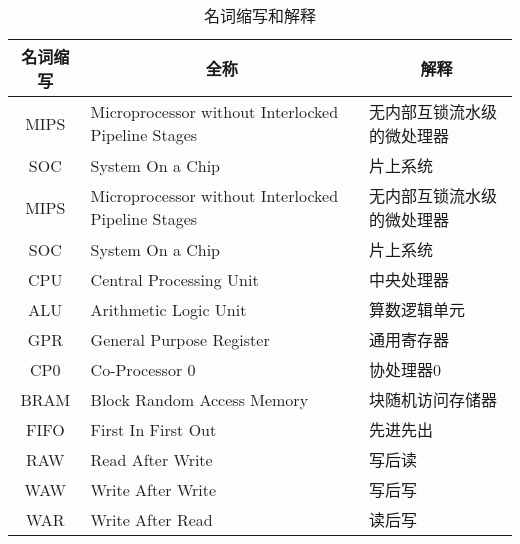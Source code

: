 \begin{table}[!htbp]
    \centering
    \caption{名词缩写和解释}
    \label{table:abbreviation_definition}
    
    \begin{tabular}{cll}
    \toprule
    \multicolumn{1}{c}{\textbf{名词缩写}} & \multicolumn{1}{c}{\textbf{全称}}                   & \multicolumn{1}{c}{\textbf{解释}} \\ 
    \midrule
    MIPS                               & Microprocessor without Interlocked Pipeline Stages & 无内部互锁流水级的微处理器                \\
    SOC                                & System On a Chip                                   & 片上系统                             \\
    MIPS                               & Microprocessor without Interlocked Pipeline Stages & 无内部互锁流水级的微处理器 \\
    SOC                                & System On a Chip                                   & 片上系统 \\
    CPU                                & Central Processing Unit                            & 中央处理器 \\
    ALU                                & Arithmetic Logic Unit                              & 算数逻辑单元 \\
    GPR                                & General Purpose Register                           & 通用寄存器 \\
    CP0                                & Co-Processor 0                                     & 协处理器0 \\
    BRAM                               & Block Random Access Memory                         & 块随机访问存储器 \\
    FIFO                               & First In First Out                                 & 先进先出 \\
    RAW                                & Read After Write                                   & 写后读 \\
    WAW                                & Write After Write                                  & 写后写 \\
    WAR                                & Write After Read                                   & 读后写 \\
    \bottomrule
    \end{tabular}
\end{table}

